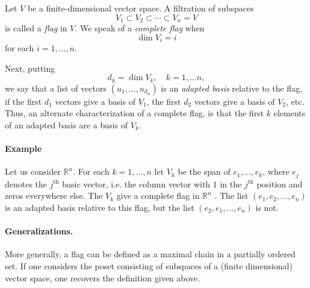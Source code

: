 \documentclass[12pt]{article}
\newcommand{\reals}{\mathbb{R}}
\newcommand{\supth}{^{\text{th}}}
\begin{document}
Let $V$ be a finite-dimensional vector space.  A filtration of
subspaces
$$V_1\subset V_2\subset\cdots \subset V_n= V$$
is called a \emph{flag} in $V$.
We speak of a {\em complete flag} when
$$\dim V_i = i$$
for each $i=1,\ldots,n$.

Next, putting
$$d_k = \dim V_k,\quad k=1,\ldots n,$$
we say that a list of vectors
$(u_1,\ldots,u_{d_n})$ is an \emph{adapted basis} relative to the flag, if
the first $d_1$ vectors give a basis of $V_1$, the first $d_2$ vectors
give a basis of $V_2$, etc.  Thus, an alternate characterization of a
complete flag, is that the first $k$ elements of an adapted basis are
a basis of $V_k$.

\paragraph{Example}
Let us consider $\reals^n$.  For each $k=1,\ldots,n$ let $V_k$ be the
span of $e_1,\ldots,e_k$, where $e_j$ denotes the $j\supth$ basic
vector, i.e. the column vector with $1$ in the $j\supth$ position and
zeros everywhere else.  The $V_k$ give a complete flag in $\reals^n$ .
The list $(e_1,e_2,\ldots, e_n)$ is an adapted basis relative to this
flag, but the list $(e_2,e_1,\ldots,e_n)$ is not.

\paragraph{Generalizations.}
More generally, a flag can be defined as a maximal chain in a partially ordered set.   If one considers the poset consisting of subspaces of a (finite dimensional) vector space, one recovers the definition given above.

\end{document}
